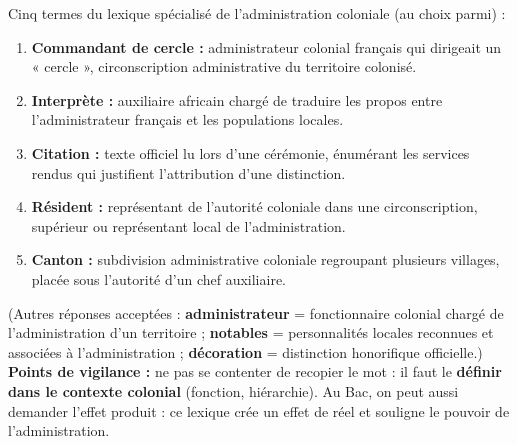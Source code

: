 \documentclass[11pt]{article}
\begin{document}
\begin{corrige}
Cinq termes du lexique spécialisé de l'administration coloniale (au choix parmi) :
\begin{enumerate}
\item \textbf{Commandant de cercle :} administrateur colonial français qui dirigeait un « cercle », circonscription administrative du territoire colonisé.
\item \textbf{Interprète :} auxiliaire africain chargé de traduire les propos entre l'administrateur français et les populations locales.
\item \textbf{Citation :} texte officiel lu lors d'une cérémonie, énumérant les services rendus qui justifient l'attribution d'une distinction.
\item \textbf{Résident :} représentant de l'autorité coloniale dans une circonscription, supérieur ou représentant local de l'administration.
\item \textbf{Canton :} subdivision administrative coloniale regroupant plusieurs villages, placée sous l'autorité d'un chef auxiliaire.
\end{enumerate}
(Autres réponses acceptées : \textbf{administrateur} = fonctionnaire colonial chargé de l'administration d'un territoire ; \textbf{notables} = personnalités locales reconnues et associées à l'administration ; \textbf{décoration} = distinction honorifique officielle.)
\textbf{Points de vigilance :} ne pas se contenter de recopier le mot : il faut le \textbf{définir dans le contexte colonial} (fonction, hiérarchie). Au Bac, on peut aussi demander l'effet produit : ce lexique crée un effet de réel et souligne le pouvoir de l'administration.
\end{corrige}
\end{document}
